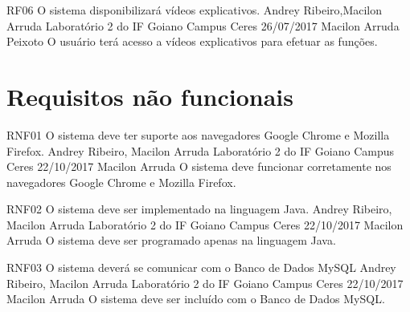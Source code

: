  \requisitoFuncional
 {RF06}
 {O sistema disponibilizará vídeos explicativos.}
 {Andrey Ribeiro,Macilon Arruda}
 {Laboratório 2 do IF Goiano Campus Ceres}
 {26/07/2017}
 {Macilon Arruda Peixoto}
 {O usuário terá acesso a vídeos explicativos para efetuar as funções.
 }
 
 
\section{Requisitos não funcionais} 
 
 \requisitoNaoFuncional
 {RNF01}
 {O sistema deve ter suporte aos navegadores Google Chrome e Mozilla Firefox.}
 {Andrey Ribeiro, Macilon Arruda}
 {Laboratório 2 do IF Goiano Campus Ceres}
 {22/10/2017}
 {Macilon Arruda}
 {O sistema deve funcionar corretamente nos navegadores Google Chrome e Mozilla Firefox.
 }

 \requisitoNaoFuncional
 {RNF02}
 {O sistema deve ser implementado na linguagem Java.}
 {Andrey Ribeiro, Macilon Arruda}
 {Laboratório 2 do IF Goiano Campus Ceres}
 {22/10/2017}
 {Macilon Arruda}
 {O sistema deve ser programado apenas na linguagem Java.
 }
 
 \requisitoNaoFuncional
 {RNF03}
 {O sistema deverá se comunicar com o Banco de Dados MySQL}
 {Andrey Ribeiro, Macilon Arruda}
 {Laboratório 2 do IF Goiano Campus Ceres}
 {22/10/2017}
 {Macilon Arruda}
 {O sistema deve ser incluído com o Banco de Dados MySQL.
 }